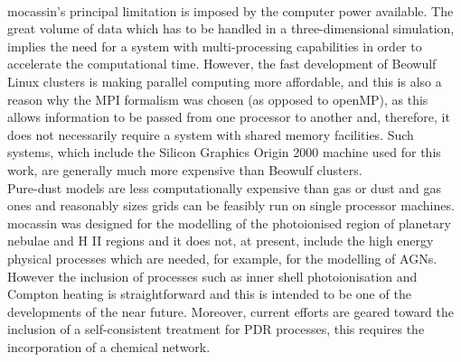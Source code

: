 \documentclass[11pt]{article}
\begin{document}
\\

   {\sc mocassin}'s principal limitation is imposed by the computer power available. 
   The great volume of data which has to be handled in a three-dimensional 
   simulation, implies the need for a system with multi-processing capabilities in 
   order to accelerate the computational time. However, the fast development of 
   Beowulf Linux clusters is making parallel computing more affordable, and this is
   also a reason why the MPI formalism was chosen (as opposed to openMP), as this 
   allows information to be passed from one processor to another and, therefore, 
   it does not necessarily require a system with shared memory facilities. Such 
   systems, which include the Silicon Graphics Origin 2000 machine used for this 
   work, are generally much more expensive than Beowulf clusters. \\

   Pure-dust models are less computationally expensive than gas or dust and gas ones
   and reasonably sizes grids can be feasibly run on single processor machines. \\

   {\sc mocassin} was designed for the modelling of the photoionised region of planetary 
   nebulae and H II regions and it does not, at present, include the high energy 
   physical processes which are needed, for example,  for the modelling of AGNs. 
   However the inclusion of processes such as inner shell photoionisation and Compton 
   heating is straightforward and this is intended to be one of the developments of the near 
   future.  Moreover, current efforts are geared toward the inclusion of a self-consistent treatment 
   for PDR processes, this requires the incorporation of a chemical network. \\
\end{document}
